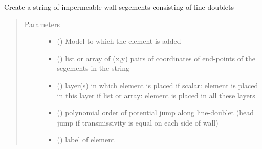 \documentclass[letterpaper,10pt,english]{sphinxmanual}
\begin{document}
\begin{fulllineitems}
\label{\detokenize{linedoublets/implinedoubletstring:timml.linedoublet.ImpLineDoubletString}}
Create a string of impermeable wall segements consisting
of line-doublets
\begin{quote}\begin{description}
\item[{Parameters}] \leavevmode\begin{itemize}
\item {} 
 () \textendash{} Model to which the element is added

\item {} 
 () \textendash{} list or array of (x,y) pairs of coordinates of end-points of
the segements in the string

\item {} 
 (\sphinxstyleliteralemphasis{, }) \textendash{} layer(s) in which element is placed
if scalar: element is placed in this layer
if list or array: element is placed in all these layers

\item {} 
 (\sphinxstyleliteralemphasis{ (}\sphinxstyleliteralemphasis{)}) \textendash{} polynomial order of potential jump along line-doublet
(head jump if transmissivity is equal on each side of wall)

\item {} 
 () \textendash{} label of element

\end{itemize}

\end{description}\end{quote}




{\hyperref[\detokenize{linedoublets/implinedoublet:timml.linedoublet.ImpLineDoublet}]{}}



\end{fulllineitems}
\end{document}
